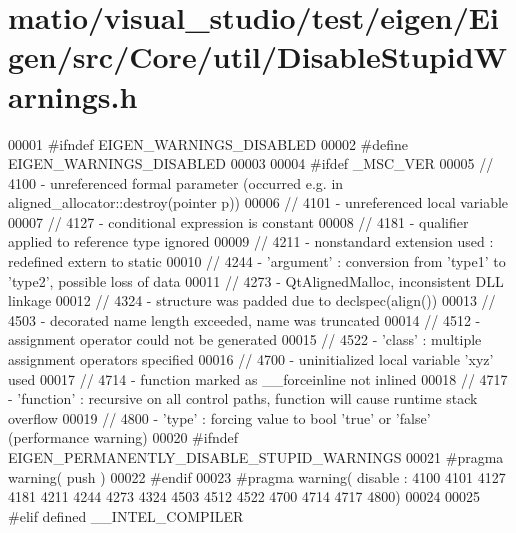 \hypertarget{matio_2visual__studio_2test_2eigen_2_eigen_2src_2_core_2util_2_disable_stupid_warnings_8h_source}{}\section{matio/visual\+\_\+studio/test/eigen/\+Eigen/src/\+Core/util/\+Disable\+Stupid\+Warnings.h}
\label{matio_2visual__studio_2test_2eigen_2_eigen_2src_2_core_2util_2_disable_stupid_warnings_8h_source}

\begin{DoxyCode}
00001 \textcolor{preprocessor}{#ifndef EIGEN\_WARNINGS\_DISABLED}
00002 \textcolor{preprocessor}{#define EIGEN\_WARNINGS\_DISABLED}
00003 
00004 \textcolor{preprocessor}{#ifdef \_MSC\_VER}
00005   \textcolor{comment}{// 4100 - unreferenced formal parameter (occurred e.g. in aligned\_allocator::destroy(pointer p))}
00006   \textcolor{comment}{// 4101 - unreferenced local variable}
00007   \textcolor{comment}{// 4127 - conditional expression is constant}
00008   \textcolor{comment}{// 4181 - qualifier applied to reference type ignored}
00009   \textcolor{comment}{// 4211 - nonstandard extension used : redefined extern to static}
00010   \textcolor{comment}{// 4244 - 'argument' : conversion from 'type1' to 'type2', possible loss of data}
00011   \textcolor{comment}{// 4273 - QtAlignedMalloc, inconsistent DLL linkage}
00012   \textcolor{comment}{// 4324 - structure was padded due to declspec(align())}
00013   \textcolor{comment}{// 4503 - decorated name length exceeded, name was truncated}
00014   \textcolor{comment}{// 4512 - assignment operator could not be generated}
00015   \textcolor{comment}{// 4522 - 'class' : multiple assignment operators specified}
00016   \textcolor{comment}{// 4700 - uninitialized local variable 'xyz' used}
00017   \textcolor{comment}{// 4714 - function marked as \_\_forceinline not inlined}
00018   \textcolor{comment}{// 4717 - 'function' : recursive on all control paths, function will cause runtime stack overflow}
00019   \textcolor{comment}{// 4800 - 'type' : forcing value to bool 'true' or 'false' (performance warning)}
00020 \textcolor{preprocessor}{  #ifndef EIGEN\_PERMANENTLY\_DISABLE\_STUPID\_WARNINGS}
00021 \textcolor{preprocessor}{    #pragma warning( push )}
00022 \textcolor{preprocessor}{  #endif}
00023 \textcolor{preprocessor}{  #pragma warning( disable : 4100 4101 4127 4181 4211 4244 4273 4324 4503 4512 4522 4700 4714 4717 4800)}
00024 
00025 \textcolor{preprocessor}{#elif defined \_\_INTEL\_COMPILER}

\end{DoxyCode}
